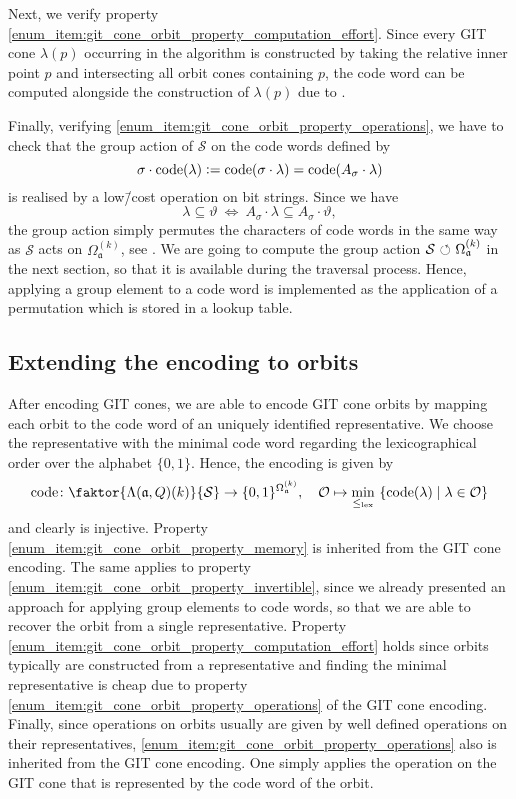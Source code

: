 Next, we verify property \ref{enum_item:git_cone_orbit_property_computation_effort}. Since every GIT cone $\lambda(p)$ occurring in the algorithm is constructed by taking the relative inner point $p$ and intersecting all orbit cones containing $p$, the code word can be computed alongside the construction of $\lambda(p)$ due to .

Finally, verifying \ref{enum_item:git_cone_orbit_property_operations},  we have to check that the group action of $\mathcal{S}$ on the code words defined by
$$\sigma\cdot\text{code}(\lambda) \mathrel{\mathop:}= \text{code}(\sigma\cdot\lambda) = \text{code}(A_\sigma\cdot\lambda)$$
is realised by a low\=/cost operation on bit strings. Since we have
$$\lambda\subseteq\vartheta\ \Leftrightarrow\ A_\sigma\cdot\lambda\subseteq A_\sigma\cdot\vartheta,$$ the group action simply permutes the characters of code words in the same way as $\mathcal{S}$ acts on $\Omega_\mathfrak{a}^{(k)}$, see . We are going to compute the group action $\mathcal{S}{\ \circlearrowleft\ }\Omega_\mathfrak{a}^{(k)}$ in the next section, so that it is available during the traversal process. Hence, applying a group element to a code word is implemented as the application of a permutation which is stored in a lookup table.

\subsection*{Extending the encoding to orbits}
After encoding GIT cones, we are able to encode GIT cone orbits by mapping each orbit to the code word of an uniquely identified representative. We choose the representative with the minimal code word regarding the lexicographical order over the alphabet $\{0,1\}$. Hence, the encoding is given by
$$\code\colon \faktor{\Lambda(\mathfrak{a},Q)(k)}{\S} \rightarrow \{0,1\}^{\Omega_\mathfrak{a}^{(k)}},\quad
\O \mapsto \min\limits_{\leq_\text{lex}}\ \{\code(\lambda) \mid \lambda\in\O\}$$
and clearly is injective. Property \ref{enum_item:git_cone_orbit_property_memory} is inherited from the GIT cone encoding. The same applies to property \ref{enum_item:git_cone_orbit_property_invertible}, since we already presented an approach for applying group elements to code words, so that we are able to recover the orbit from a single representative. Property \ref{enum_item:git_cone_orbit_property_computation_effort} holds since orbits typically are constructed from a representative and finding the minimal representative is cheap due to property \ref{enum_item:git_cone_orbit_property_operations} of the GIT cone encoding. Finally, since operations on orbits usually are given by well defined operations on their representatives, \ref{enum_item:git_cone_orbit_property_operations} also is inherited from the GIT cone encoding. One simply applies the operation on the GIT cone that is represented by the code word of the orbit.

